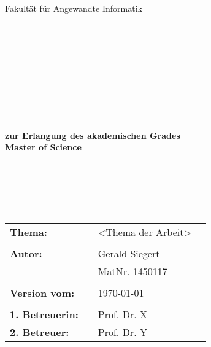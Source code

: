 \begin{center}
\Large{Fakultät für Angewandte Informatik}
\end{center}
\begin{verbatim}




\end{verbatim}
\begin{center}
\doublespacing
\textbf{\LARGE{\titleDocument}}\\
\singlespacing
\begin{verbatim}

\end{verbatim}
\textbf{{~\subjectDocument~}}
\end{center}
\begin{verbatim}

\end{verbatim}
\begin{center}

\end{center}
\begin{verbatim}

\end{verbatim}
\begin{center}
\textbf{zur Erlangung des akademischen Grades \\ Master of Science}
\end{center}
\begin{verbatim}






\end{verbatim}
\begin{flushleft}
\begin{tabular}{llll}
\textbf{Thema:} & & <Thema der Arbeit> & \\
& & \\
\textbf{Autor:} & & Gerald Siegert & \\
& & MatNr. 1450117 & \\
& & \\
\textbf{Version vom:} & & \today &\\
& & \\
\textbf{1. Betreuerin:} & & Prof. Dr. X &\\
\textbf{2. Betreuer:} & & Prof. Dr. Y &\\
\end{tabular}
\end{flushleft}